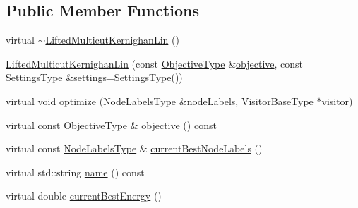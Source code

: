 \subsection*{Public Member Functions}
\begin{DoxyCompactItemize}
\item 
virtual \hyperlink{classnifty_1_1graph_1_1opt_1_1lifted__multicut_1_1LiftedMulticutKernighanLin_aea08e0ae50fca3e7c577a94195165825}{$\sim$\+Lifted\+Multicut\+Kernighan\+Lin} ()
\item 
\hyperlink{classnifty_1_1graph_1_1opt_1_1lifted__multicut_1_1LiftedMulticutKernighanLin_ac0e6db9d278ca6b1ffe613345ccf413b}{Lifted\+Multicut\+Kernighan\+Lin} (const \hyperlink{classnifty_1_1graph_1_1opt_1_1lifted__multicut_1_1LiftedMulticutKernighanLin_ace1226557a9d65b35b09e1e38b11b0b3}{Objective\+Type} \&\hyperlink{classnifty_1_1graph_1_1opt_1_1lifted__multicut_1_1LiftedMulticutKernighanLin_a14feeebb40c32f817af780c6605b8a7d}{objective}, const \hyperlink{structnifty_1_1graph_1_1opt_1_1lifted__multicut_1_1LiftedMulticutKernighanLin_1_1SettingsType}{Settings\+Type} \&settings=\hyperlink{structnifty_1_1graph_1_1opt_1_1lifted__multicut_1_1LiftedMulticutKernighanLin_1_1SettingsType}{Settings\+Type}())
\item 
virtual void \hyperlink{classnifty_1_1graph_1_1opt_1_1lifted__multicut_1_1LiftedMulticutKernighanLin_a1a171e9e18477dd7b3446fd5d09dda39}{optimize} (\hyperlink{classnifty_1_1graph_1_1opt_1_1lifted__multicut_1_1LiftedMulticutKernighanLin_aac39b263efe0f990f6bf6989babec8a4}{Node\+Labels\+Type} \&node\+Labels, \hyperlink{classnifty_1_1graph_1_1opt_1_1lifted__multicut_1_1LiftedMulticutKernighanLin_a3c55dddb71a3b4dabe10de599ff330eb}{Visitor\+Base\+Type} $\ast$visitor)
\item 
virtual const \hyperlink{classnifty_1_1graph_1_1opt_1_1lifted__multicut_1_1LiftedMulticutKernighanLin_ace1226557a9d65b35b09e1e38b11b0b3}{Objective\+Type} \& \hyperlink{classnifty_1_1graph_1_1opt_1_1lifted__multicut_1_1LiftedMulticutKernighanLin_a14feeebb40c32f817af780c6605b8a7d}{objective} () const
\item 
virtual const \hyperlink{classnifty_1_1graph_1_1opt_1_1lifted__multicut_1_1LiftedMulticutKernighanLin_aac39b263efe0f990f6bf6989babec8a4}{Node\+Labels\+Type} \& \hyperlink{classnifty_1_1graph_1_1opt_1_1lifted__multicut_1_1LiftedMulticutKernighanLin_a91e6337efe1f6d4dface1170410317d3}{current\+Best\+Node\+Labels} ()
\item 
virtual std\+::string \hyperlink{classnifty_1_1graph_1_1opt_1_1lifted__multicut_1_1LiftedMulticutKernighanLin_a682849d66dfe885424c729600754a160}{name} () const
\item 
virtual double \hyperlink{classnifty_1_1graph_1_1opt_1_1lifted__multicut_1_1LiftedMulticutKernighanLin_ace0e35ceeaefa85843716a300ca0a3bf}{current\+Best\+Energy} ()
\end{DoxyCompactItemize}


